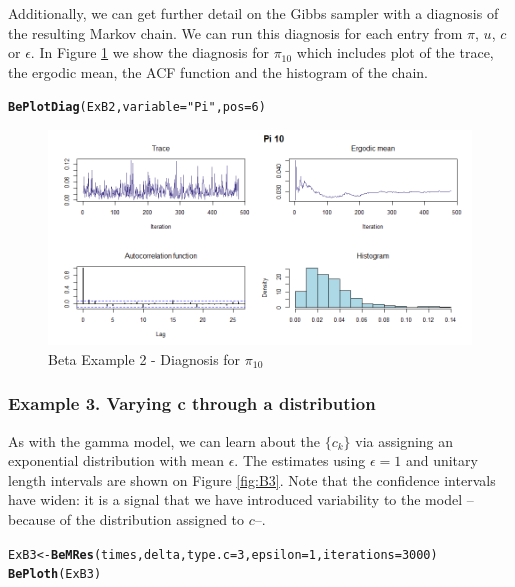 \documentclass[letterpaper]{article}\usepackage[]{graphicx}\usepackage[]{xcolor}
\makeatletter
\newcommand{\hlnum}[1]{\textcolor[rgb]{0.686,0.059,0.569}{#1}}%
\newcommand{\hlstr}[1]{\textcolor[rgb]{0.192,0.494,0.8}{#1}}%
\newcommand{\hlstd}[1]{\textcolor[rgb]{0.345,0.345,0.345}{#1}}%
\newcommand{\hlkwb}[1]{\textcolor[rgb]{0.69,0.353,0.396}{#1}}%
\newcommand{\hlkwc}[1]{\textcolor[rgb]{0.333,0.667,0.333}{#1}}%
\newcommand{\hlkwd}[1]{\textcolor[rgb]{0.737,0.353,0.396}{\textbf{#1}}}%
\newenvironment{kframe}{%
 \def\at@end@of@kframe{}%
 \ifinner\ifhmode%
  \def\at@end@of@kframe{\end{minipage}}%
  \begin{minipage}{\columnwidth}%
 \fi\fi%
 \def\FrameCommand##1{\hskip\@totalleftmargin \hskip-\fboxsep
 \colorbox{shadecolor}{##1}\hskip-\fboxsep
     \hskip-\linewidth \hskip-\@totalleftmargin \hskip\columnwidth}%
 \MakeFramed {\advance\hsize-\width
   \@totalleftmargin\z@ \linewidth\hsize
   \@setminipage}}%
 {\par\unskip\endMakeFramed%
 \at@end@of@kframe}
\newenvironment{knitrout}{}{} %
\makeatother
\begin{document}
Additionally, we can get further detail on the Gibbs sampler with a diagnosis of the resulting Markov chain. We can run this diagnosis for each entry from $\pi$, $u$, $c$ or $\epsilon$. In Figure \ref{fig:B2a} we show the diagnosis for $\pi_{10}$ which includes plot of the trace, the ergodic mean, the ACF function and the histogram of the chain.

\begin{knitrout}
\color{fgcolor}\begin{kframe}
\begin{alltt}
\hlkwd{BePlotDiag}\hlstd{(ExB2,} \hlkwc{variable} \hlstd{=} \hlstr{"Pi"}\hlstd{,} \hlkwc{pos} \hlstd{=} \hlnum{6}\hlstd{)}
\end{alltt}
\end{kframe}
\end{knitrout}

\begin{figure}
  \centering
  \includegraphics[width=\textwidth]{B23.png}
  \caption{Beta Example 2 - Diagnosis for $\pi_{10}$}
  \label{fig:B2a}
\end{figure}

\subsubsection{Example 3. Varying c through a distribution}

As with the gamma model, we can learn about the $\{c_k\}$ via assigning an exponential distribution with mean $\epsilon$. The estimates using $\epsilon = 1$ and unitary length intervals are shown on Figure \ref{fig:B3}. Note that the confidence intervals have widen: it is a signal that we have introduced variability to the model --because of the distribution assigned to $c$--.
 
\begin{knitrout}
\color{fgcolor}\begin{kframe}
\begin{alltt}
\hlstd{ExB3} \hlkwb{<-} \hlkwd{BeMRes}\hlstd{(times, delta,} \hlkwc{type.c} \hlstd{=} \hlnum{3}\hlstd{,} \hlkwc{epsilon} \hlstd{=} \hlnum{1}\hlstd{,} \hlkwc{iterations} \hlstd{=} \hlnum{3000}\hlstd{)}
\hlkwd{BePloth}\hlstd{(ExB3)}
\end{alltt}
\end{kframe}
\end{knitrout}
\end{document}
